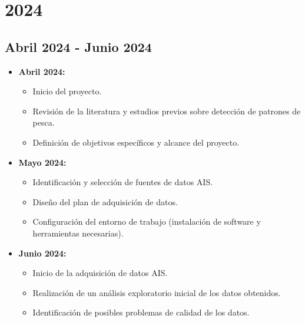
\section{2024}
\subsection{Abril 2024 - Junio 2024}
\begin{itemize}
    \item \textbf{Abril 2024:}
    \begin{itemize}
        \item Inicio del proyecto.
        \item Revisión de la literatura y estudios previos sobre detección de patrones de pesca.
        \item Definición de objetivos específicos y alcance del proyecto.
    \end{itemize}
    
    \item \textbf{Mayo 2024:}
    \begin{itemize}
        \item Identificación y selección de fuentes de datos AIS.
        \item Diseño del plan de adquisición de datos.
        \item Configuración del entorno de trabajo (instalación de software y herramientas necesarias).
    \end{itemize}
    
    \item \textbf{Junio 2024:}
    \begin{itemize}
        \item Inicio de la adquisición de datos AIS.
        \item Realización de un análisis exploratorio inicial de los datos obtenidos.
        \item Identificación de posibles problemas de calidad de los datos.
    \end{itemize}
\end{itemize}

